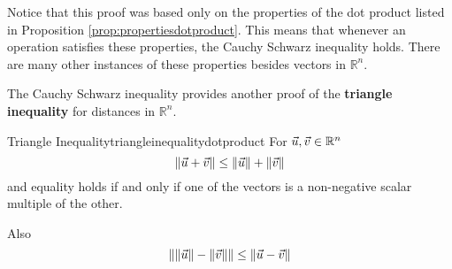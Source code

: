 Notice that this proof was based only on the properties of
the dot product listed in Proposition \ref{prop:propertiesdotproduct}. This means that
whenever an operation satisfies these properties, the Cauchy Schwarz inequality
holds. There are many other instances of these properties besides vectors in
$\mathbb{R}^{n}$.

The Cauchy Schwarz inequality provides another proof of the \textbf{triangle
inequality} for
distances in $\mathbb{R}^{n}$.

\begin{theorem}{Triangle Inequality}{triangleinequalitydotproduct}
  For $\vec{u},\vec{v}\in \mathbb{R}^{n}$
\begin{equation}
\| \vec{u}+\vec{v}\| \leq \| \vec{u}\| +\| \vec{v}
\|  \label{triangleineq1}
\end{equation}
and equality holds if and only if one of the vectors is a non-negative scalar
multiple of the other. 

Also
\begin{equation}
\| \| \vec{u}\| -\| \vec{v}\| \| \leq
\| \vec{u}-\vec{v}\|  \label{triangleineq2}
\end{equation}
\end{theorem}

